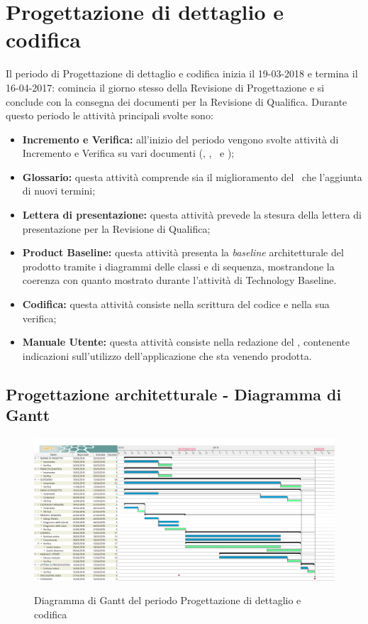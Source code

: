 \documentclass[PianoDiProgetto.tex]{subfiles}
\begin{document}
\section{Progettazione di dettaglio e codifica}
Il periodo di Progettazione di dettaglio e codifica inizia il 19-03-2018 e termina il 16-04-2017: comincia il giorno stesso della Revisione di Progettazione e si conclude con la consegna dei documenti per la Revisione di Qualifica. Durante questo periodo le attività principali svolte sono:
\begin{itemize}
	\item \textbf{Incremento e Verifica:} all'inizio del periodo vengono svolte attività di Incremento e Verifica su vari documenti (\normediprogetto, \pianodiprogetto, \pianodiqualifica\ e \technology);
	\item \textbf{Glossario:} questa attività comprende sia il miglioramento del \glossario\ che l'aggiunta di nuovi termini;
	\item \textbf{Lettera di presentazione:} questa attività prevede la stesura della lettera di presentazione per la Revisione di Qualifica;
	\item \textbf{Product Baseline:} questa attività presenta la \textit{baseline} architetturale del prodotto tramite i  diagrammi delle classi e di sequenza, mostrandone la coerenza con quanto mostrato durante l'attività di Technology Baseline. 
	\item \textbf{Codifica:} questa attività consiste nella scrittura del codice e nella sua verifica;
	\item \textbf{Manuale Utente:} questa attività consiste nella redazione del \manualeutente, contenente indicazioni sull’utilizzo dell'applicazione che sta venendo prodotta.
\end{itemize}

\begin{landscape}
	\subsection{Progettazione architetturale - Diagramma di Gantt}
	\begin{figure}[ht]
		\includegraphics[width=20.5cm]{images/gantt/qualifica.png}
		\label{fig:foo}
		\caption{Diagramma di Gantt del periodo Progettazione di dettaglio e codifica}
	\end{figure}	
\end{landscape}
\end{document}
